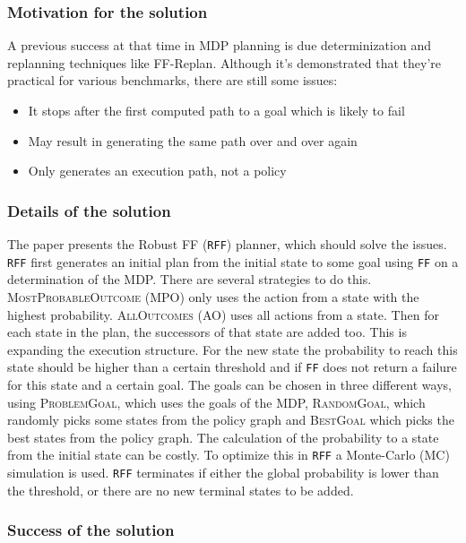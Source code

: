 \documentclass[runningheads,a4paper]{llncs}
\begin{document}
\subsubsection{Motivation for the solution}

A previous success at that time in MDP planning is due determinization and
replanning techniques like FF-Replan. Although it's demonstrated that they're
practical for various benchmarks, there are still some issues:

\begin{itemize}
	\item It stops after the first computed path to a goal which is likely to fail
	\item May result in generating the same path over and over again
	\item Only generates an execution path, not a policy
\end{itemize}



\subsubsection{Details of the solution}

The paper presents the Robust FF (\texttt{RFF}) planner, which should solve the
issues. \texttt{RFF} first generates an initial plan from the initial state to
some goal using \texttt{FF} on a determination of the MDP\@. There are several
strategies to do this. \textsc{MostProbableOutcome} (MPO) only uses the action
from a state with the highest probability. \textsc{AllOutcomes} (AO) uses all
actions from a state. Then for each state in the plan, the successors of that
state are added too. This is expanding the execution structure. For the new
state the probability to reach this state should be higher than a certain
threshold and if \texttt{FF} does not return a failure for this state and a
certain goal. The goals can be chosen in three different ways, using
\textsc{ProblemGoal}, which uses the goals of the MDP, \textsc{RandomGoal},
which randomly picks some states from the policy graph and \textsc{BestGoal}
which picks the best states from the policy graph. The calculation of the
probability to a state from the initial state can be costly. To optimize this
in \texttt{RFF} a Monte-Carlo (MC) simulation is used. \texttt{RFF} terminates
if either the global probability is lower than the threshold, or there are no
new terminal states to be added.


\subsubsection{Success of the solution}
\end{document}
